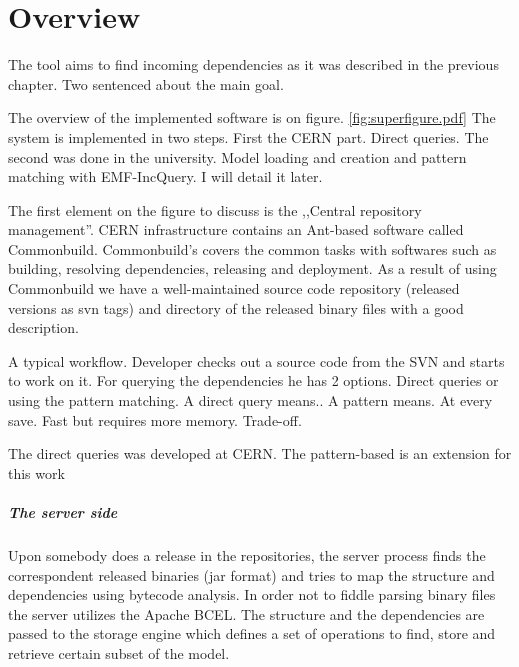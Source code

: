 \chapter{Overview}


The tool aims to find incoming dependencies as it was described in the previous
chapter.
Two sentenced about the main goal.


The overview of the implemented software is on figure.
\autoref{fig:superfigure.pdf} The system is implemented in two steps. First the
CERN part. Direct queries. The second was done in the university. Model  loading
and creation and pattern matching with EMF-IncQuery. I will detail it later.

The first element on the figure to discuss is the ,,Central repository
management''. CERN infrastructure contains an Ant-based software called
Commonbuild. Commonbuild's covers the common tasks with softwares such as
building, resolving dependencies, releasing and deployment. As a result of using
Commonbuild we have a well-maintained source code repository (released versions
as svn tags) and directory of the released binary files with a good description.

A typical workflow. Developer checks out a source code from the SVN and starts
to work on it. For querying the dependencies he has 2 options. Direct queries or
using the pattern matching. A direct query means.. A pattern means. At every
save. Fast but requires more memory. Trade-off.

The direct queries was developed at CERN.
The pattern-based is an extension for this work

\paragraph{The server side} 
Upon somebody does a release in the repositories, the server process finds the
correspondent released binaries (jar format) and tries to map the structure and
dependencies using bytecode analysis. In order not to fiddle parsing binary
files the server utilizes the Apache BCEL. The structure and the dependencies
are passed to the storage engine which defines a set of operations to find,
store and retrieve certain subset of the model.

